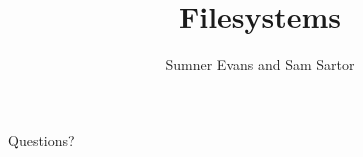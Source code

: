 \documentclass{lug}
\title{Filesystems}
\author{Sumner Evans and Sam Sartor}
\institute{Mines Linux Users Group}
\begin{document}
\begin{frame}[standout]
    \Huge
    Questions?
\end{frame}
\end{document}
